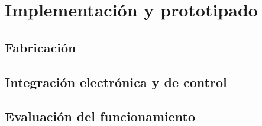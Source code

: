 
\chapter{Implementación y prototipado}
\label{cap:implementacion}


\section{Fabricación}
\label{sec:fabricacion}


\section{Integración electrónica y de control}
\label{sec:integracion}


\section{Evaluación del funcionamiento}
\label{sec:evaluacion_funcionamiento}


